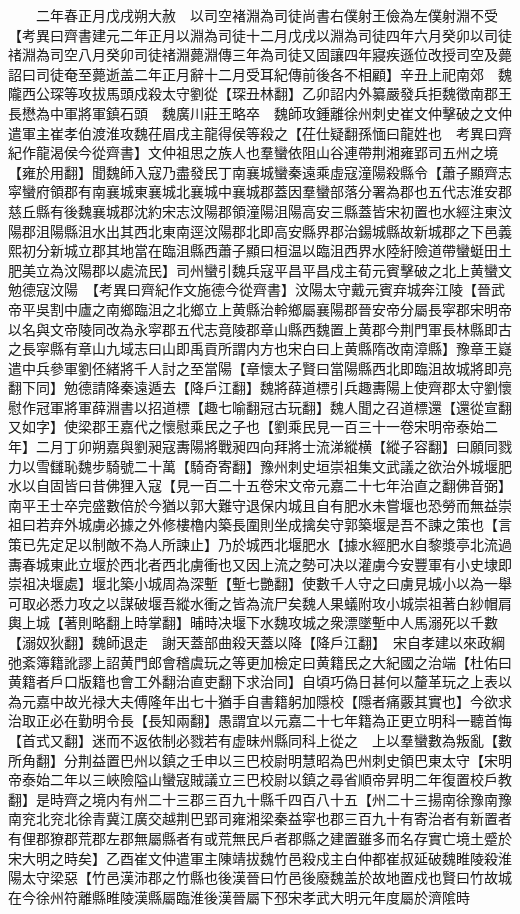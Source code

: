 　　二年春正月戊戌朔大赦　以司空褚淵為司徒尚書右僕射王儉為左僕射淵不受　【考異曰齊書建元二年正月以淵為司徒十二月戊戌以淵為司徒四年六月癸卯以司徒禇淵為司空八月癸卯司徒禇淵薨淵傳三年為司徒又固讓四年寢疾遜位改授司空及薨詔曰司徒奄至薨逝盖二年正月辭十二月受耳紀傳前後各不相顧】辛丑上祀南郊　魏隴西公琛等攻拔馬頭戍殺太守劉從【琛丑林翻】乙卯詔内外纂嚴發兵拒魏徵南郡王長懋為中軍將軍鎮石頭　魏廣川莊王略卒　魏師攻鍾離徐州刺史崔文仲擊破之文仲遣軍主崔孝伯渡淮攻魏茌眉戌主龍得侯等殺之【茌仕疑翻孫愐曰龍姓也　考異曰齊紀作龍渴侯今從齊書】文仲祖思之族人也羣蠻依阻山谷連帶荆湘雍郢司五州之境【雍於用翻】聞魏師入寇乃盡發民丁南襄城蠻秦遠乘虛寇潼陽殺縣令【蕭子顯齊志寜蠻府領郡有南襄城東襄城北襄城中襄城郡蓋因羣蠻部落分署為郡也五代志淮安郡慈丘縣有後魏襄城郡沈約宋志汶陽郡領潼陽沮陽高安三縣蓋皆宋初置也水經注東汶陽郡沮陽縣沮水出其西北東南逕汶陽郡北即高安縣界郡治鍚城縣故新城郡之下邑義熙初分新城立郡其地當在臨沮縣西蕭子顯曰桓温以臨沮西界水陸紆險道帶蠻蜓田土肥美立為汶陽郡以處流民】司州蠻引魏兵寇平昌平昌戍主荀元賓擊破之北上黄蠻文勉德寇汶陽　【考異曰齊紀作文施德今從齊書】汶陽太守戴元賓弃城奔江陵【晉武帝平吳割中廬之南鄉臨沮之北鄉立上黄縣治軨鄉屬襄陽郡晉安帝分屬長寜郡宋明帝以名與文帝陵同改為永寜郡五代志竟陵郡章山縣西魏置上黄郡今荆門軍長林縣即古之長寜縣有章山九域志曰山即禹貢所謂内方也宋白曰上黄縣隋改南漳縣】豫章王嶷遣中兵參軍劉伾緒將千人討之至當陽【章懷太子賢曰當陽縣西北即臨沮故城將即亮翻下同】勉德請降秦遠遁去【降戶江翻】魏將薛道標引兵趣夀陽上使齊郡太守劉懷慰作冠軍將軍薛淵書以招道標【趣七喻翻冠古玩翻】魏人聞之召道標還【還從宣翻又如字】使梁郡王嘉代之懷慰乘民之子也【劉乘民見一百三十一卷宋明帝泰始二年】二月丁卯朔嘉與劉昶寇夀陽將戰昶四向拜將士流涕縱横【縱子容翻】曰願同戮力以雪讎恥魏步騎號二十萬【騎奇寄翻】豫州刺史垣崇祖集文武議之欲治外城堰肥水以自固皆曰昔佛狸入寇【見一百二十五卷宋文帝元嘉二十七年治直之翻佛音弼】南平王士卒完盛數倍於今猶以郭大難守退保内城且自有肥水未嘗堰也恐勞而無益崇祖曰若弃外城虜必據之外修樓櫓内築長圍則坐成擒矣守郭築堰是吾不諫之策也【言策已先定足以制敵不為人所諫止】乃於城西北堰肥水【據水經肥水自黎漿亭北流過夀春城東此立堰於西北者西北虜衝也又因上流之勢可决以灌虜今安豐軍有小史埭即崇祖决堰處】堰北築小城周為深塹【塹七艷翻】使數千人守之曰虜見城小以為一舉可取必悉力攻之以謀破堰吾縱水衝之皆為流尸矣魏人果蟻附攻小城崇祖著白紗帽肩輿上城【著則略翻上時掌翻】晡時决堰下水魏攻城之衆漂墜塹中人馬溺死以千數【溺奴狄翻】魏師退走　謝天蓋部曲殺天蓋以降【降戶江翻】　宋自孝建以來政綱弛紊簿籍訛謬上詔黄門郎會稽虞玩之等更加檢定曰黄籍民之大紀國之治端【杜佑曰黄籍者戶口版籍也會工外翻治直吏翻下求治同】自頃巧偽日甚何以釐革玩之上表以為元嘉中故光禄大夫傅隆年出七十猶手自書籍躬加隱校【隱者痛覈其實也】今欲求治取正必在勤明令長【長知兩翻】愚謂宜以元嘉二十七年籍為正更立明科一聽首悔【首式又翻】迷而不返依制必戮若有虚昧州縣同科上從之　上以羣蠻數為叛亂【數所角翻】分荆益置巴州以鎮之壬申以三巴校尉明慧昭為巴州刺史領巴東太守【宋明帝泰始二年以三峽險隘山蠻寇賊議立三巴校尉以鎮之尋省順帝昇明二年復置校戶教翻】是時齊之境内有州二十三郡三百九十縣千四百八十五【州二十三揚南徐豫南豫南兖北兖北徐青冀江廣交越荆巴郢司雍湘梁秦益寜也郡三百九十有寄治者有新置者有俚郡獠郡荒郡左郡無屬縣者有或荒無民戶者郡縣之建置雖多而名存實亡境土蹙於宋大明之時矣】乙酉崔文仲遣軍主陳靖拔魏竹邑殺戍主白仲都崔叔延破魏睢陵殺淮陽太守梁惡【竹邑漢沛郡之竹縣也後漢晉曰竹邑後廢魏盖於故地置戍也賢曰竹故城在今徐州符離縣睢陵漢縣屬臨淮後漢晉屬下邳宋孝武大明元年度屬於濟隂時